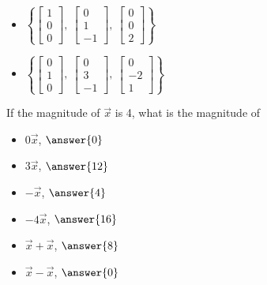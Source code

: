 \documentclass{ximera}
\begin{document}
\begin{exercise}
\begin{itemize}
\begin{multipleChoice}
        \end{multipleChoice}
        \item $\left\{ \begin{bmatrix} 1 \\ 0 \\ 0 \end{bmatrix},\ \begin{bmatrix} 0 \\ 1 \\ -1 \end{bmatrix},\ \begin{bmatrix} 0 \\ 0 \\ 2 \end{bmatrix}\right\}$
        \begin{multipleChoice}
        \end{multipleChoice}
        \item $\left\{ \begin{bmatrix} 0 \\ 1 \\ 0 \end{bmatrix},\ \begin{bmatrix} 0 \\ 3 \\ -1 \end{bmatrix},\ \begin{bmatrix} 0 \\ -2 \\ 1 \end{bmatrix}\right\}$
        \begin{multipleChoice}
        \end{multipleChoice}
    \end{itemize}
\end{exercise}


\begin{exercise}
    If the magnitude of $\vec{x}$ is 4, what is the magnitude of
    \begin{itemize}
        \item $0\vec{x}$, $\answer{0}$
        \item $3\vec{x}$, $\answer{12}$
        \item $-\vec{x}$, $\answer{4}$
        \item $-4\vec{x}$, $\answer{16}$
        \item $\vec{x}+\vec{x}$, $\answer{8}$
        \item $\vec{x}-\vec{x}$, $\answer{0}$
    \end{itemize}
\end{exercise}
\end{document}
